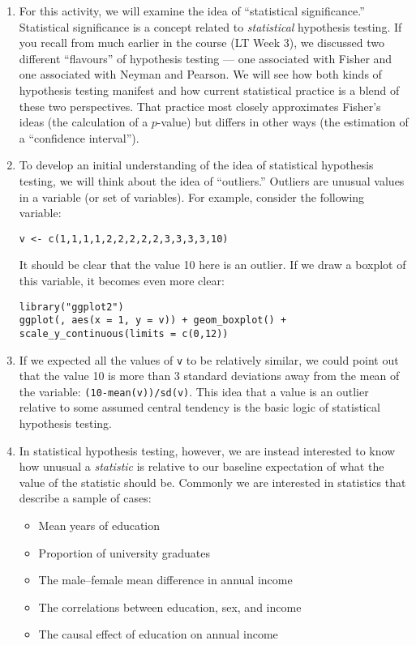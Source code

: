 \documentclass[a4paper,12pt]{article}
\begin{document}
\begin{enumerate}

\item For this activity, we will examine the idea of ``statistical significance.'' Statistical significance is a concept related to \textit{statistical} hypothesis testing. If you recall from much earlier in the course (LT Week 3), we discussed two different ``flavours'' of hypothesis testing --- one associated with Fisher and one associated with Neyman and Pearson. We will see how both kinds of hypothesis testing manifest and how current statistical practice is a blend of these two perspectives. That practice most closely approximates Fisher's ideas (the calculation of a $p$-value) but differs in other ways (the estimation of a ``confidence interval'').

\item To develop an initial understanding of the idea of statistical hypothesis testing, we will think about the idea of ``outliers.'' Outliers are unusual values in a variable (or set of variables). For example, consider the following variable:

\begin{verbatim}
v <- c(1,1,1,1,2,2,2,2,2,3,3,3,3,10)
\end{verbatim}

\noindent It should be clear that the value 10 here is an outlier. If we draw a boxplot of this variable, it becomes even more clear:

\begin{verbatim}
library("ggplot2")
ggplot(, aes(x = 1, y = v)) + geom_boxplot() + scale_y_continuous(limits = c(0,12))
\end{verbatim}

\item If we expected all the values of \texttt{v} to be relatively similar, we could point out that the value 10 is more than 3 standard deviations away from the mean of the variable: \texttt{(10-mean(v))/sd(v)}. This idea that a value is an outlier relative to some assumed central tendency is the basic logic of statistical hypothesis testing.

\item In statistical hypothesis testing, however, we are instead interested to know how unusual a \textit{statistic} is relative to our baseline expectation of what the value of the statistic should be. Commonly we are interested in statistics that describe a sample of cases:

\begin{itemize}
\item Mean years of education
\item Proportion of university graduates
\item The male--female mean difference in annual income
\item The correlations between education, sex, and income
\item The causal effect of education on annual income
\end{itemize}


\end{enumerate}
\end{document}
